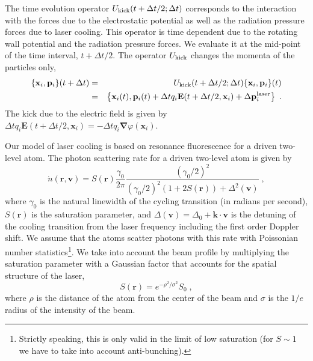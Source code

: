 \documentclass[aps, pra, preprint]{revtex4-1}
\begin{document}
The time evolution operator $U_{\rm kick}(t + \Delta t/2; \Delta
t)$ corresponds to the interaction with the forces due to the
electrostatic potential as well as the radiation pressure forces
due to laser cooling. This operator is time dependent due to the
rotating wall potential and the radiation pressure forces. We
evaluate it at the mid-point of the time interval, $t + \Delta t
/ 2$. The operator $U_{\rm kick}$ changes the momenta of the
particles only,
\begin{eqnarray}
  \{\mathbf{x}_i, \mathbf{p}_i\}(t + \Delta t)
  &=& U_{\rm kick}(t + \Delta t /2; \Delta t)
    \{\mathbf{x}_i, \mathbf{p}_i\}(t)\\
  &=&\left\{
      \mathbf{x}_i(t),
      \mathbf{p}_i(t) +
      \Delta t q_i \mathbf{E}(t + \Delta t / 2, \mathbf{x}_i) +
      \Delta \mathbf{p}_i^{\rm laser}
      \right\}\;.
\end{eqnarray}
The kick due to the electric field is given by $\Delta t
q_i\mathbf{E}(t+\Delta t /2,\mathbf{x}_i) = -\Delta t
q_i\mathbf{\nabla}\varphi(\mathbf{x}_i)$.

Our model of laser cooling is based on resonance fluorescence for
a driven two-level atom. The photon scattering rate for a driven
two-level atom is given by
\begin{equation}
\dot n (\mathbf{r}, \mathbf{v}) = 
S(\mathbf{r})\frac{\gamma_0}{2\pi}
\frac{(\gamma_0/2)^2}{(\gamma_0/2)^2(1+2S(\mathbf{r}))+\Delta^2(\mathbf{v})}\;,
\end{equation}
where $\gamma_0$ is the natural linewidth of the cycling transition (in
radians per second), $S(\mathbf{r})$ is the saturation parameter, and
$\Delta(\mathbf{v})=\Delta_0 + \mathbf{k}\cdot\mathbf{v}$ is the
detuning of the cooling transition from the laser frequency including
the first order Doppler shift.  We assume that the atoms scatter photons
with this rate with Poissonian number statistics\footnote{Strictly
speaking, this is only valid in the limit of low saturation (for
$S\sim 1$ we have to take into account anti-bunching).}.  We take into
account the beam profile by multiplying the saturation parameter with a
Gaussian factor that accounts for the spatial structure of the laser,
\begin{equation}
S(\mathbf{r})=e^{-\rho^2/\sigma^2}S_0\;,
\end{equation}
where $\rho$ is the distance of the atom from the center of the beam and
$\sigma$ is the $1/e$ radius of the intensity of the beam.
\end{document}

